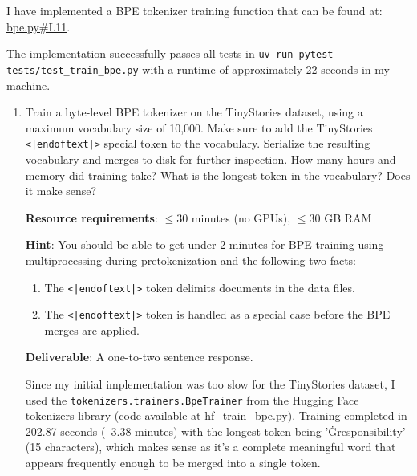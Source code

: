 \begin{answer}
I have implemented a BPE tokenizer training function that can be found at: \href{https://github.com/donglinkang2021/assignment1-basics/blob/main/cs336_basics/bpe.py#L11}{bpe.py\#L11}.

The implementation successfully passes all tests in \lstinline{uv run pytest tests/test_train_bpe.py} with a runtime of approximately 22 seconds in my machine.
\end{answer}


\begin{enumerate}[label=(\alph*)]
    \item Train a byte-level BPE tokenizer on the TinyStories dataset, using a maximum vocabulary size of 10,000. Make sure to add the TinyStories \lstinline{<|endoftext|>} special token to the vocabulary. Serialize the resulting vocabulary and merges to disk for further inspection. How many hours and memory did training take? What is the longest token in the vocabulary? Does it make sense?
    
    \textbf{Resource requirements}: $\le$30 minutes (no GPUs), $\le$30 GB RAM
    
    \textbf{Hint}: You should be able to get under 2 minutes for BPE training using multiprocessing during pretokenization and the following two facts:
    \begin{enumerate}[label=(\alph*)]
        \item The \lstinline{<|endoftext|>} token delimits documents in the data files.
        \item The \lstinline{<|endoftext|>} token is handled as a special case before the BPE merges are applied.
    \end{enumerate}
    
    \textbf{Deliverable}: A one-to-two sentence response.
    
    \begin{answer}
    Since my initial implementation was too slow for the TinyStories dataset, I used the \lstinline{tokenizers.trainers.BpeTrainer} from the Hugging Face tokenizers library (code available at \href{https://github.com/donglinkang2021/assignment1-basics/blob/main/data_utils/hf_train_bpe.py}{hf\_train\_bpe.py}). Training completed in 202.87 seconds (~3.38 minutes) with the longest token being 'Ġresponsibility' (15 characters), which makes sense as it's a complete meaningful word that appears frequently enough to be merged into a single token.
    \end{answer}
    

\end{enumerate}

